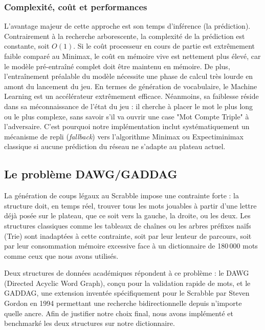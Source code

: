 \documentclass[a4paper]{article}
\begin{document}
    \subsubsection*{Complexité, coût et performances}
    L'avantage majeur de cette approche est son temps d'inférence (la prédiction). Contrairement à la recherche arborescente, la complexité de la prédiction est constante, soit $O(1)$.
    Si le coût processeur en cours de partie est extrêmement faible comparé au Minimax, le coût en mémoire vive est nettement plus élevé, car le modèle pré-entraîné complet doit être maintenu en mémoire. De plus, l'entraînement préalable du modèle nécessite une phase de calcul très lourde en amont du lancement du jeu.
    En termes de génération de vocabulaire, le Machine Learning est un accélérateur extrêmement efficace. Néanmoins, sa faiblesse réside dans sa méconnaissance de l'état du jeu : il cherche à placer le mot le plus long ou le plus complexe, sans savoir s'il va ouvrir une case "Mot Compte Triple" à l'adversaire. C'est pourquoi notre implémentation inclut systématiquement un mécanisme de repli (\textit{fallback}) vers l'algorithme Minimax ou Expectiminimax classique si aucune prédiction du réseau ne s'adapte au plateau actuel.


    \subsection{Le problème DAWG/GADDAG}

La génération de coups légaux au Scrabble impose une contrainte forte : la structure doit, en temps réel, trouver tous les mots jouables à partir d'une lettre déjà posée sur le plateau, que ce soit vers la gauche, la droite, ou les deux. Les structures classiques comme les tableaux de chaînes ou les arbres préfixes naïfs (Trie) sont inadaptées à cette contrainte, soit par leur lenteur de parcours, soit par leur consommation mémoire excessive face à un dictionnaire de 180\,000 mots comme ceux que nous avons utilisés. \newline

Deux structures de données académiques répondent à ce problème : le DAWG (Directed Acyclic Word Graph), conçu pour la validation rapide de mots, et le GADDAG, une extension inventée spécifiquement pour le Scrabble par Steven Gordon en 1994 permettant une recherche bidirectionnelle depuis n'importe quelle ancre. Afin de justifier notre choix final, nous avons implémenté et benchmarké les deux structures sur notre dictionnaire.\newline
\end{document}
